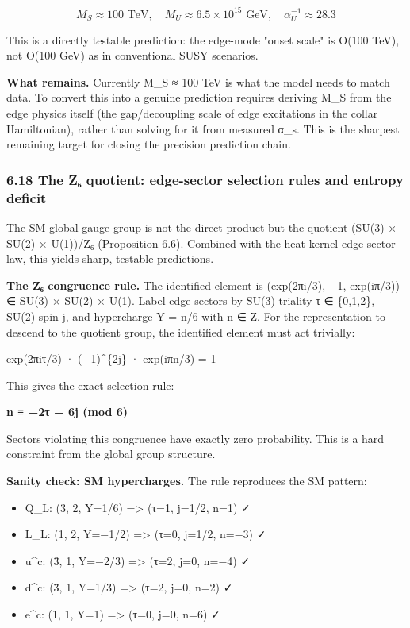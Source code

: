 \[
M_S \approx 100 \text{ TeV}, \quad M_U \approx 6.5 \times 10^{15} \text{ GeV}, \quad \alpha_U^{-1} \approx 28.3
\]

This is a directly testable prediction: the edge-mode "onset scale" is O(100 TeV), not O(100 GeV) as in conventional SUSY scenarios.

\textbf{What remains.} Currently M\_S ≈ 100 TeV is what the model needs to match data. To convert this into a genuine prediction requires deriving M\_S from the edge physics itself (the gap/decoupling scale of edge excitations in the collar Hamiltonian), rather than solving for it from measured α\_s. This is the sharpest remaining target for closing the precision prediction chain.

\subsubsection{6.18 The Z₆ quotient: edge-sector selection rules and entropy deficit}\label{618-the-zux2086-quotient-edge-sector-selection-rules-and-entropy-deficit}

The SM global gauge group is not the direct product but the quotient (SU(3) × SU(2) × U(1))/Z₆ (Proposition 6.6). Combined with the heat-kernel edge-sector law, this yields sharp, testable predictions.

\textbf{The Z₆ congruence rule.} The identified element is (exp(2πi/3), −1, exp(iπ/3)) ∈ SU(3) × SU(2) × U(1). Label edge sectors by SU(3) triality τ ∈ \{0,1,2\}, SU(2) spin j, and hypercharge Y = n/6 with n ∈ Z. For the representation to descend to the quotient group, the identified element must act trivially:

exp(2πiτ/3) · (−1)\^{}\{2j\} · exp(iπn/3) = 1

This gives the exact selection rule:

\textbf{n ≡ −2τ − 6j (mod 6)}

Sectors violating this congruence have exactly zero probability. This is a hard constraint from the global group structure.

\textbf{Sanity check: SM hypercharges.} The rule reproduces the SM pattern:

\begin{itemize}
\tightlist
\item
  Q\_L: (3, 2, Y=1/6) =\textgreater{} (τ=1, j=1/2, n=1) ✓
\item
  L\_L: (1, 2, Y=−1/2) =\textgreater{} (τ=0, j=1/2, n=−3) ✓
\item
  u\^{}c: (\={3}, 1, Y=−2/3) =\textgreater{} (τ=2, j=0, n=−4) ✓
\item
  d\^{}c: (\={3}, 1, Y=1/3) =\textgreater{} (τ=2, j=0, n=2) ✓
\item
  e\^{}c: (1, 1, Y=1) =\textgreater{} (τ=0, j=0, n=6) ✓
\end{itemize}

